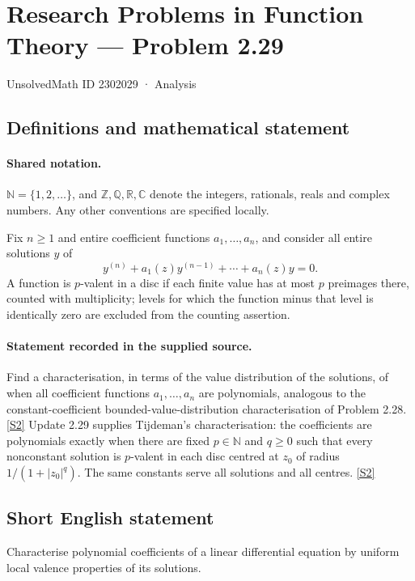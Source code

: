 \documentclass[11pt]{article}
\newcommand{\sref}[2]{\hyperlink{source:#1:#2}{[S#2]}}
\begin{document}
\setcounter{section}{2302028}
\section{Research Problems in Function Theory — Problem 2.29}\label{2302029}
{\small\sffamily UnsolvedMath ID 2302029 · Analysis}
\subsection{Definitions and mathematical statement}

\paragraph{Shared notation.}$\mathbb N=\{1,2,\ldots\}$, and $\mathbb Z,\mathbb Q,\mathbb R,\mathbb C$ denote the integers, rationals, reals and complex numbers. Any other conventions are specified locally.


Fix $n\ge1$ and entire coefficient functions $a_1,\ldots,a_n$, and consider all entire solutions $y$ of
\[y^{(n)}+a_1(z)y^{(n-1)}+\cdots+a_n(z)y=0.\]
A function is $p$-valent in a disc if each finite value has at most $p$ preimages there, counted with multiplicity; levels for which the function minus that level is identically zero are excluded from the counting assertion.

\paragraph{Statement recorded in the supplied source.}
Find a characterisation, in terms of the value distribution of the solutions, of when all coefficient functions $a_1,\ldots,a_n$ are polynomials, analogous to the constant-coefficient bounded-value-distribution characterisation of Problem 2.28. \sref{2302029}{2}
Update 2.29 supplies Tijdeman's characterisation: the coefficients are polynomials exactly when there are fixed $p\in\mathbb N$ and $q\ge0$ such that every nonconstant solution is $p$-valent in each disc centred at $z_0$ of radius $1/(1+|z_0|^q)$. The same constants serve all solutions and all centres. \sref{2302029}{2}
\subsection{Short English statement}
Characterise polynomial coefficients of a linear differential equation by uniform local valence properties of its solutions.
\end{document}
